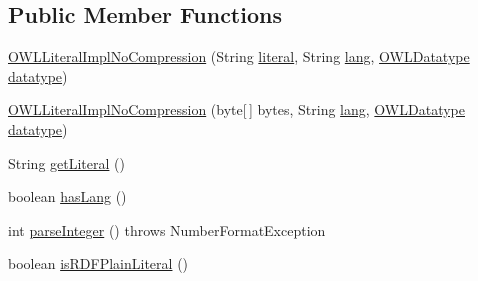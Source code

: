 \subsection*{Public Member Functions}
\begin{DoxyCompactItemize}
\item 
\hyperlink{classuk_1_1ac_1_1manchester_1_1cs_1_1owl_1_1owlapi_1_1_o_w_l_literal_impl_no_compression_ab9f2e5dfc33ff28076662a760703b2d9}{O\-W\-L\-Literal\-Impl\-No\-Compression} (String \hyperlink{classuk_1_1ac_1_1manchester_1_1cs_1_1owl_1_1owlapi_1_1_o_w_l_literal_impl_no_compression_a42ec8de09641c8de35ae44f159540fb9}{literal}, String \hyperlink{classuk_1_1ac_1_1manchester_1_1cs_1_1owl_1_1owlapi_1_1_o_w_l_literal_impl_no_compression_a4ba98dcaaa940c6ac91a3986f03a9fad}{lang}, \hyperlink{interfaceorg_1_1semanticweb_1_1owlapi_1_1model_1_1_o_w_l_datatype}{O\-W\-L\-Datatype} \hyperlink{classuk_1_1ac_1_1manchester_1_1cs_1_1owl_1_1owlapi_1_1_o_w_l_literal_impl_no_compression_a85b84035fcf40734ce472ab8ec7474ad}{datatype})
\item 
\hyperlink{classuk_1_1ac_1_1manchester_1_1cs_1_1owl_1_1owlapi_1_1_o_w_l_literal_impl_no_compression_abf1899e025a1bf682187f2cb90e85766}{O\-W\-L\-Literal\-Impl\-No\-Compression} (byte\mbox{[}$\,$\mbox{]} bytes, String \hyperlink{classuk_1_1ac_1_1manchester_1_1cs_1_1owl_1_1owlapi_1_1_o_w_l_literal_impl_no_compression_a4ba98dcaaa940c6ac91a3986f03a9fad}{lang}, \hyperlink{interfaceorg_1_1semanticweb_1_1owlapi_1_1model_1_1_o_w_l_datatype}{O\-W\-L\-Datatype} \hyperlink{classuk_1_1ac_1_1manchester_1_1cs_1_1owl_1_1owlapi_1_1_o_w_l_literal_impl_no_compression_a85b84035fcf40734ce472ab8ec7474ad}{datatype})
\item 
String \hyperlink{classuk_1_1ac_1_1manchester_1_1cs_1_1owl_1_1owlapi_1_1_o_w_l_literal_impl_no_compression_a65fefc9cbc269c5bcc3638cd14923d6a}{get\-Literal} ()
\item 
boolean \hyperlink{classuk_1_1ac_1_1manchester_1_1cs_1_1owl_1_1owlapi_1_1_o_w_l_literal_impl_no_compression_aa1b75a1d85365cb73e202826c5c06791}{has\-Lang} ()
\item 
int \hyperlink{classuk_1_1ac_1_1manchester_1_1cs_1_1owl_1_1owlapi_1_1_o_w_l_literal_impl_no_compression_a5cfd9c8500615e677554135c856123b9}{parse\-Integer} ()  throws Number\-Format\-Exception 
\item 
boolean \hyperlink{classuk_1_1ac_1_1manchester_1_1cs_1_1owl_1_1owlapi_1_1_o_w_l_literal_impl_no_compression_acbda62d9f1c890c684ac3f44fb56fa74}{is\-R\-D\-F\-Plain\-Literal} ()
\item 

\end{DoxyCompactItemize}
